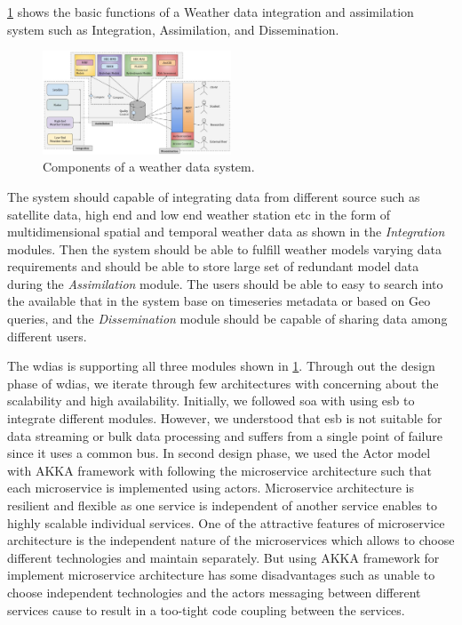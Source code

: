 \documentclass[conference]{IEEEtran}
\begin{document}
\cref{pfi:wdia_components} shows the basic functions of a Weather data integration and assimilation system such as Integration, Assimilation, and Dissemination.

\begin{figure}[htbp]
\centerline{\includegraphics[width=0.5\textwidth]{method/misc/weather_data_system_components.jpg}}
\caption{Components of a weather data system.}
\label{pfi:wdia_components}
\end{figure}

The system should capable of integrating data from different source such as satellite data, high end and low end weather station etc in the form of multidimensional spatial and temporal weather data as shown in the \emph{Integration} modules.
Then the system should be able to fulfill weather models varying data requirements and should be able to store large set of redundant model data during the \emph{Assimilation} module.
The users should be able to easy to search into the available that in the system base on timeseries metadata or based on Geo queries, and the \emph{Dissemination} module should be capable of sharing data among different users.

The \acrshort{wdias} is supporting all three modules shown in \cref{pfi:wdia_components}. Through out the design phase of \acrshort{wdias}, we iterate through few architectures with concerning about the scalability and high availability. Initially, we followed \acrfull{soa} with using \acrfull{esb} to integrate different modules. However, we understood that \acrshort{esb} is not suitable for data streaming or bulk data processing and suffers from a single point of failure since it uses a common bus.
In second design phase, we used the Actor model with AKKA framework with following the microservice architecture such that each microservice is implemented using actors. Microservice architecture is resilient and flexible as one service is independent of another service enables to highly scalable individual services. One of the attractive features of microservice architecture is the independent nature of the microservices which allows to choose different technologies and maintain separately. But using AKKA framework for implement microservice architecture has some disadvantages such as unable to choose independent technologies and the actors messaging between different services cause to result in a too-tight code coupling between the services.
\end{document}
